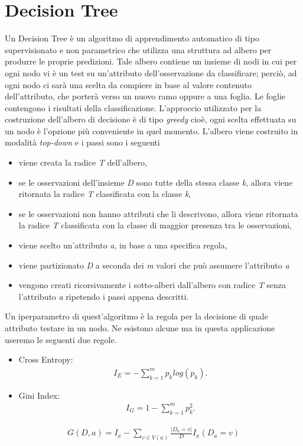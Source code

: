 \section{Decision Tree}
Un Decision Tree \autocite{} è un algoritmo di apprendimento automatico di tipo supervisionato e non parametrico che utilizza una struttura ad albero per produrre le proprie predizioni. Tale albero contiene un insieme di nodi in cui per ogni nodo vi è un test su un'attributo dell'osservazione da classificare; perciò, ad ogni nodo ci sarà una scelta da compiere in base al valore contenuto dell'attributo, che porterà verso un nuovo ramo oppure a una foglia. Le foglie contengono i risultati della classificazione. L'approccio utilizzato per la costruzione dell'albero di decisione è di tipo \emph{greedy} cioè, ogni scelta effettuata su un nodo è l'opzione più conveniente in quel momento. L'albero viene costruito in modalità \emph{top-down} e i passi sono i seguenti
\begin{itemize}
	\item viene creata la radice \emph{T} dell'albero,
	\item se le osservazioni dell'insieme \emph{D} sono tutte della stessa classe \emph{k}, allora viene ritornata la radice \emph{T} classificata con la classe \emph{k},
	\item se le osservazioni non hanno attributi che li descrivono, allora viene ritornata la radice \emph{T} classificata con la classe di maggior presenza tra le osservazioni,
	\item viene scelto un'attributo \emph{a}, in base a una specifica regola, 
	\item viene partizionato \emph{D} a seconda dei \emph{m} valori che può assumere l'attributo \emph{a} 
	\item vengono creati ricorsivamente i sotto-alberi dall'albero con radice \emph{T} senza l'attributo \emph{a} ripetendo i passi appena descritti.
\end{itemize} 
Un iperparametro di quest'algoritmo è la regola per la decisione di quale attributo testare in un nodo. Ne esistono alcune ma in questa applicazione useremo le seguenti due regole.
\begin{itemize}
	\item Cross Entropy: \begin{align*}
		I_E =	- \sum_{k=1}^{m} p_k log(p_k).
		\end{align*} 
	\item Gini Index: \begin{align*}
			I_G = 1 - \sum_{k=1}^{m} p_{k}^2.
		\end{align*} 
\end{itemize}

\begin{align*}
	G(D,a) = I_x - \sum_{v\in V(a)} \frac{|D_a = v|}{D}I_x(D_a=v)
\end{align*} 



